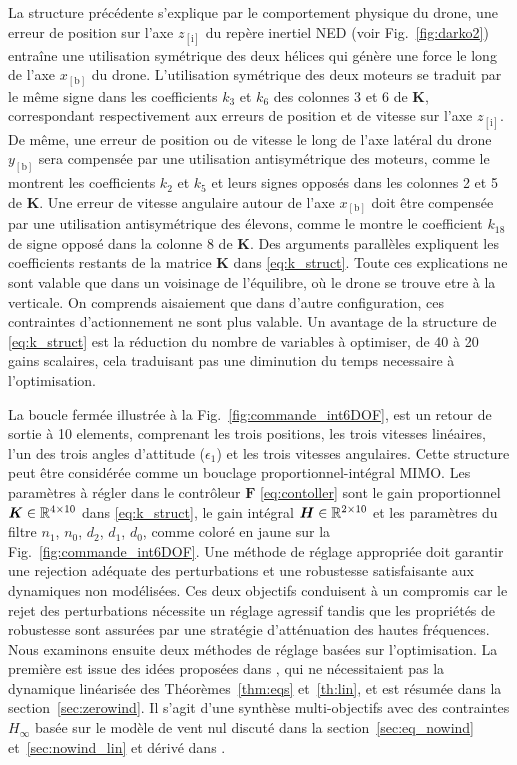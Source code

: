 La structure précédente s'explique par le comportement physique du drone, une erreur de position sur l'axe $z_{[\text{i}]}$ du repère inertiel NED (voir Fig.~\ref{fig:darko2}) entraîne une utilisation symétrique des deux hélices qui génère une force le long de l'axe $x_{[\text{b}]}$ du drone. L'utilisation symétrique des deux moteurs se traduit par le même signe dans les coefficients $k_{3}$ et $k_{6}$ des colonnes 3 et 6 de $\boldsymbol{K}$, correspondant respectivement aux erreurs de position et de vitesse sur l'axe $z_{[\text{i}]}$. De même, une erreur de position ou de vitesse le long de l'axe latéral du drone $y_{[\text{b}]}$ sera compensée par une utilisation antisymétrique des moteurs, comme le montrent les coefficients $k_{2}$ et $k_{5}$ et leurs signes opposés dans les colonnes 2 et 5 de $\boldsymbol{K}$. Une erreur de vitesse angulaire autour de l'axe $x_{[\text{b}]}$ doit être compensée par une utilisation antisymétrique des élevons, comme le montre le coefficient $k_{18}$ de signe opposé dans la colonne 8 de $\boldsymbol{K}$. Des arguments parallèles expliquent les coefficients restants de la matrice $\boldsymbol{K}$ dans \eqref{eq:k_struct}. Toute ces explications ne sont valable que dans un voisinage de l'équilibre, où le drone se trouve etre à la verticale. On comprends aisaiement que dans d'autre configuration, ces contraintes d'actionnement ne sont plus valable. Un avantage de la structure de \eqref{eq:k_struct} est la réduction du nombre de variables à optimiser, de 40 à 20 gains scalaires, cela traduisant pas une diminution du temps necessaire à l'optimisation.

La boucle fermée illustrée à la Fig.~\ref{fig:commande_int6DOF}, est un retour de sortie à 10 elements, comprenant les trois positions, les trois vitesses linéaires, l'un des trois angles d'attitude ($\epsilon_{1}$) et les trois vitesses angulaires. Cette structure peut être considérée comme un bouclage proportionnel-intégral MIMO. Les paramètres à régler dans le contrôleur $\boldsymbol{F}$ \eqref{eq:contoller} sont le gain proportionnel $\boldsymbol{K} \in {\mathbb R}^{4\times10}$ dans \eqref{eq:k_struct}, le gain intégral $\boldsymbol{H} \in {\mathbb R}^{2\times10}$ et les paramètres du filtre $n_1$, $n_0$, $d_2$, $d_1$, $d_0$, comme coloré en jaune sur la Fig.~\ref{fig:commande_int6DOF}. Une méthode de réglage appropriée doit garantir une rejection adéquate des perturbations et une robustesse satisfaisante aux dynamiques non modélisées. Ces deux objectifs conduisent à un compromis car le rejet des perturbations nécessite un réglage agressif tandis que les propriétés de robustesse sont assurées par une stratégie d'atténuation des hautes fréquences. Nous examinons ensuite deux méthodes de réglage basées sur l'optimisation. 
La première est issue des idées proposées dans \cite{SANSOUACA}, qui ne nécessitaient pas la dynamique linéarisée des Théorèmes~\ref{thm:eqs} et~\ref{th:lin}, et est résumée dans la section~\ref{sec:zerowind}. Il s'agit d'une synthèse multi-objectifs avec des contraintes $H_{\infty}$ basée sur le modèle de vent nul discuté dans la section~\ref{sec:eq_nowind} et~\ref{sec:nowind_lin} et dérivé dans \cite{SANSOUACA}.


